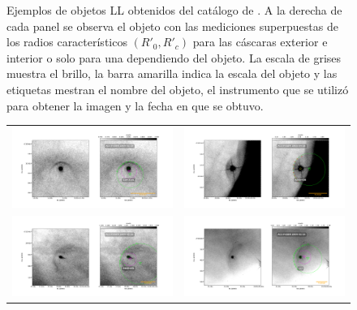 \begin{figure}
\begin{tabular}{cc}
  \end{tabular}
  \caption{Ejemplos de objetos LL obtenidos del catálogo de \citet{Gutierrez-Soto:2015a}. A la derecha de cada panel se observa el objeto con las mediciones superpuestas de los radios característicos $(R'_0, R'_c)$ para las cáscaras exterior e interior o solo para una dependiendo del objeto. La escala de grises muestra el brillo, la barra amarilla indica la escala del objeto y las etiquetas mestran el nombre del objeto, el instrumento que se utilizó para obtener la imagen y la fecha en que se obtuvo.}
  \label{fig:Luis-mosaic-1}
\end{figure}


\begin{figure}
  \centering
  \ContinuedFloat
    \captionsetup{list=off,format=cont}
  \begin{tabular}{cc}
    \includegraphics[width=0.5\linewidth]{./Figures/116-3101-Bally_14-images} & \includegraphics[width=0.5\linewidth]{./Figures/4285-458-Robberto_ACS_1r_f658n-images} \\ \includegraphics[width=0.5\linewidth]{./Figures/4468-605-Bally_17-images} &
\includegraphics[width=0.5\linewidth]{./Figures/LL3-Bally_17-images}
  \end{tabular}
  \caption{}
  \label{fig:Luis-mosaic-2}
\end{figure}



